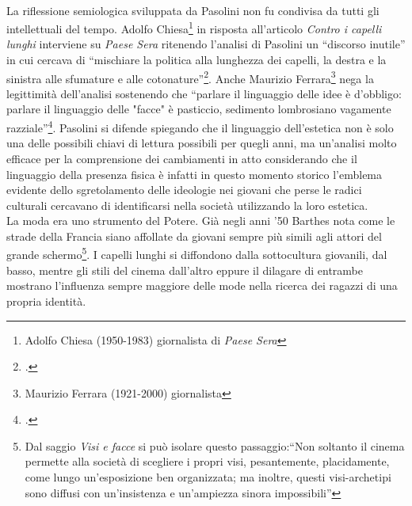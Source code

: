 \paragraph{}La riflessione semiologica sviluppata da Pasolini non fu condivisa da tutti gli intellettuali del tempo.
Adolfo Chiesa\footnote{Adolfo Chiesa (1950-1983) giornalista di \textit{Paese Sera}} in risposta all'articolo \textit{Contro i capelli lunghi} interviene su \textit{Paese Sera} ritenendo l'analisi di Pasolini un \enquote{discorso inutile} in cui cercava di \enquote{mischiare la politica alla lunghezza dei capelli, la destra e la sinistra alle sfumature e alle cotonature}\footcite{AdolfoChiesa}.
Anche Maurizio Ferrara\footnote{Maurizio Ferrara (1921-2000) giornalista} nega la legittimità dell'analisi sostenendo che \enquote{parlare il linguaggio delle idee è d'obbligo: parlare il linguaggio delle "facce" è pasticcio, sedimento lombrosiano vagamente razziale}\footcite{FerraraMaurizio}.
Pasolini si difende spiegando che il linguaggio dell'estetica non è solo una delle possibili chiavi di lettura possibili per quegli anni, ma un'analisi molto efficace per la comprensione dei cambiamenti in atto considerando che il linguaggio della presenza fisica è infatti in questo momento storico l'emblema evidente dello sgretolamento delle ideologie nei giovani che perse le radici culturali cercavano di identificarsi nella società utilizzando la loro estetica.
\\La moda era uno strumento del Potere.
Già negli anni '50 Barthes nota come le strade della Francia siano affollate da giovani sempre più simili agli attori del grande schermo\footnote{Dal saggio \textit{Visi e facce} si può isolare questo passaggio:\enquote{Non soltanto il cinema permette alla società di scegliere i propri visi, pesantemente, placidamente, come lungo un'esposizione ben organizzata; ma inoltre, questi visi-archetipi sono diffusi con un'insistenza e un'ampiezza sinora impossibili}}.
I capelli lunghi si diffondono dalla sottocultura giovanili, dal basso, mentre gli stili del cinema dall'altro eppure il dilagare di entrambe mostrano l'influenza sempre maggiore delle mode nella ricerca dei ragazzi di una propria identità.



